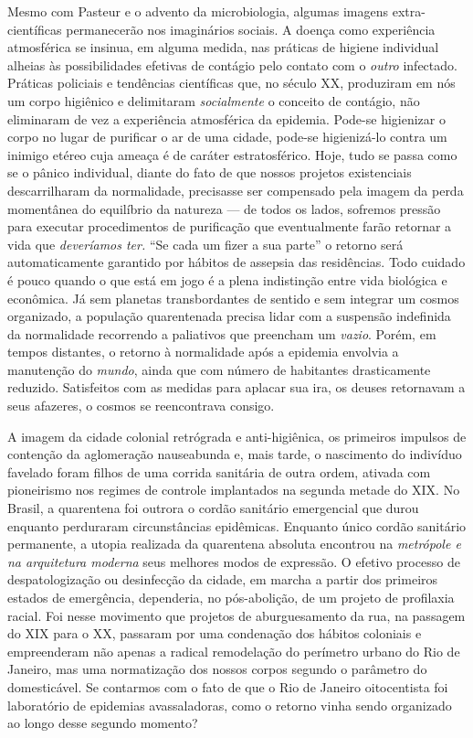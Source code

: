 Mesmo com Pasteur e o advento da microbiologia, algumas imagens
extra-científicas permanecerão nos imaginários sociais. A doença como
experiência atmosférica se insinua, em alguma medida, nas práticas de
higiene individual alheias às possibilidades efetivas de contágio pelo
contato com o \emph{outro} infectado. Práticas policiais e tendências
científicas que, no século XX, produziram em nós um corpo higiênico e
delimitaram \emph{socialmente} o conceito de contágio, não eliminaram de
vez a experiência atmosférica da epidemia. Pode-se higienizar o corpo no
lugar de purificar o ar de uma cidade, pode-se higienizá-lo contra um
inimigo etéreo cuja ameaça é de caráter estratosférico. Hoje, tudo se
passa como se o pânico individual, diante do fato de que nossos projetos
existenciais descarrilharam da normalidade, precisasse ser compensado
pela imagem da perda momentânea do equilíbrio da natureza --- de todos
os lados, sofremos pressão para executar procedimentos de purificação
que eventualmente farão retornar a vida que \emph{deveríamos ter.} ``Se
cada um fizer a sua parte'' o retorno será automaticamente garantido por
hábitos de assepsia das residências. Todo cuidado é pouco quando o que
está em jogo é a plena indistinção entre vida biológica e econômica. Já
sem planetas transbordantes de sentido e sem integrar um cosmos
organizado, a população quarentenada precisa lidar com a suspensão
indefinida da normalidade recorrendo a paliativos que preencham um
\emph{vazio}. Porém, em tempos distantes, o retorno à normalidade após a
epidemia envolvia a manutenção do \emph{mundo}, ainda que com número de
habitantes drasticamente reduzido. Satisfeitos com as medidas para
aplacar sua ira, os deuses retornavam a seus afazeres, o cosmos se
reencontrava consigo.

A imagem da cidade colonial retrógrada e anti-higiênica, os primeiros
impulsos de contenção da aglomeração nauseabunda e, mais tarde, o
nascimento do indivíduo favelado foram filhos de uma corrida sanitária
de outra ordem, ativada com pioneirismo nos regimes de controle
implantados na segunda metade do XIX. No Brasil, a quarentena foi
outrora o cordão sanitário emergencial que durou enquanto perduraram
circunstâncias epidêmicas. Enquanto único cordão sanitário permanente, a
utopia realizada da quarentena absoluta encontrou na \emph{metrópole e
na arquitetura moderna} seus melhores modos de expressão. O efetivo
processo de despatologização ou desinfecção da cidade, em marcha a
partir dos primeiros estados de emergência, dependeria, no pós-abolição,
de um projeto de profilaxia racial. Foi nesse movimento que projetos de
aburguesamento da rua, na passagem do XIX para o XX, passaram por uma
condenação dos hábitos coloniais e empreenderam não apenas a radical
remodelação do perímetro urbano do Rio de Janeiro, mas uma normatização
dos nossos corpos segundo o parâmetro do domesticável. Se contarmos com
o fato de que o Rio de Janeiro oitocentista foi laboratório de epidemias
avassaladoras, como o retorno vinha sendo organizado ao longo desse
segundo momento?


